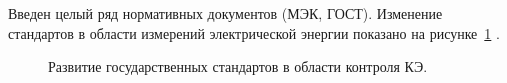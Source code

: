 Введен целый ряд нормативных документов (МЭК, ГОСТ). Изменение стандартов в области измерений электрической энергии показано на рисунке~\ref{img:picture1} \cite{ГОСТ30804.4.30-2013, ГОСТ30804.4.7-2013, ГОСТ32144-2013, ГОСТР8.655-2009, ГОСТР51317.4.15-2012,ГОСТ33073-2014,ГОСТ8.622-2013}. 
 
\begin{figure}[ht]
	\caption{Развитие государственных стандартов в области контроля КЭ.}\label{img:picture1}
\end{figure}







